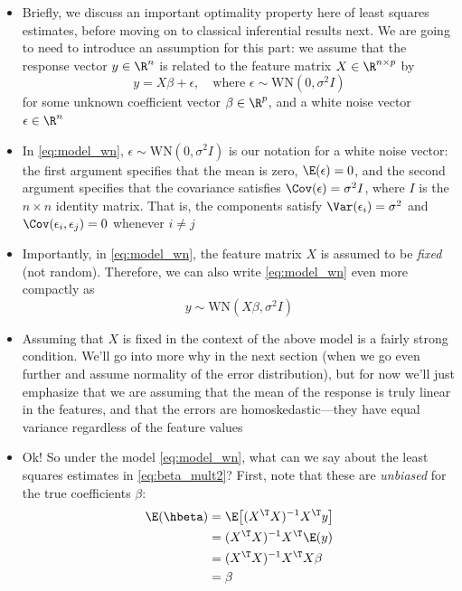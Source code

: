 \documentclass{article}
\begin{document}
\def\WN{\mathrm{WN}}
\def\MSE{\mathrm{MSE}}

\begin{itemize}
\item Briefly, we discuss an important optimality property here of least squares
  estimates, before moving on to classical inferential results next. We are
  going to need to introduce an assumption for this part: we assume that the
  response vector $y \in \R^n$ is related to the feature matrix $X \in \R^{n
    \times p}$ by
  \begin{equation}
  \label{eq:model_wn}
  y = X \beta + \epsilon, \quad \text{where $\epsilon \sim \WN(0, \sigma^2 I)$}   
  \end{equation}
  for some unknown coefficient vector $\beta \in \R^p$, and a white noise vector 
  $\epsilon \in \R^n$

\item In \eqref{eq:model_wn}, $\epsilon \sim \WN(0, \sigma^2 I)$ is our notation
  for a white noise vector: the first argument specifies that the mean is zero, 
  $\E(\epsilon) = 0$, and the second argument specifies that the covariance
  satisfies $\Cov(\epsilon) = \sigma^2 I$, where $I$ is the $n \times n$
  identity matrix. That is, the components satisfy $\Var(\epsilon_i) = \sigma^2$
  and $\Cov(\epsilon_i, \epsilon_j) = 0$ whenever $i \not= j$

\item Importantly, in \eqref{eq:model_wn}, the feature matrix $X$ is assumed to
  be \emph{fixed} (not random). Therefore, we can also write \eqref{eq:model_wn}
  even more compactly as 
  \[
  y \sim \WN(X \beta, \sigma^2 I)
  \]

\item Assuming that $X$ is fixed in the context of the above model is a fairly
  strong condition. We'll go into more why in the next section (when we go even 
  further and assume normality of the error distribution), but for now we'll
  just emphasize that we are assuming that the mean of the response is truly
  linear in the features, and that the errors are homoskedastic---they have
  equal variance regardless of the feature values 

\item Ok! So under the model \eqref{eq:model_wn}, what can we say about the
  least squares estimates in \eqref{eq:beta_mult2}? First, note that these are 
  \emph{unbiased} for the true coefficients $\beta$:
  \begin{align*}
  \E(\hbeta) &= \E \big[ (X^\T X)^{-1} X^\T y \big] \\
  &= (X^\T X)^{-1} X^\T \E(y) \\
  &= (X^\T X)^{-1} X^\T X \beta \\
  &= \beta
  \end{align*}


\end{itemize}
\end{document}

